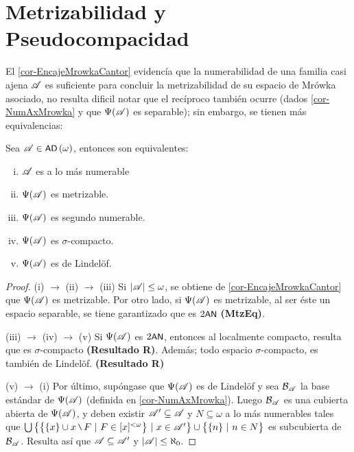 	\section{Metrizabilidad y Pseudocompacidad}

	El \autoref{cor-EncajeMrowkaCantor} evidencía que la numerabilidad de una familia casi ajena $\mathscr{A}$ es suficiente para concluir la metrizabilidad de su espacio de Mrówka asociado, no resulta dificil notar que el recíproco también ocurre (dados \ref{cor-NumAxMrowka} y que $\Psi(\mathscr{A})$ es separable); sin embargo, se tienen más equivalencias:
	
	\begin{proposicion}\label{prop-tra-numerable}
		Sea $\mathscr{A}\in \operatorname{\text{\textsf{\small AD}}}\,(\omega)$, entonces son equivalentes:
		\begin{enumerate}[i)]
			\item $\mathscr{A}$ es a lo más numerable
			\item $\Psi(\mathscr{A})$ es metrizable.
			\item $\Psi(\mathscr{A})$ es segundo numerable.
			\item $\Psi(\mathscr{A})$ es $\sigma$-compacto.
			\item $\Psi(\mathscr{A})$ es de Lindelöf.
		\end{enumerate}
	\end{proposicion}
	
	\begin{proof} 
		(i) $\rightarrow$ (ii) $\rightarrow$ (iii) Si $|\mathscr{A}| \leq \omega$, se obtiene de \ref{cor-EncajeMrowkaCantor} que $\Psi(\mathscr{A})$ es metrizable. Por otro lado, si $\Psi(\mathscr{A})$ es metrizable, al ser éste un espacio separable, se tiene garantizado que es $2\text{\textsf{\small AN}}$ \textbf{(MtzEq)}.
			
		(iii) $\rightarrow$ (iv) $\to$ (v) Si $\Psi(\mathscr{A})$ es $2\text{\textsf{\small AN}}$, entonces al localmente compacto, resulta que es $\sigma$-compacto \textbf{(Resultado R)}. Además; todo espacio $\sigma$-compacto, es también de Lindelöf. \textbf{(Resultado R)}
			
		(v) $\rightarrow$ (i) Por último, supóngase que $\Psi(\mathscr{A})$ es de Lindelöf y sea $\mathcal{B}_{\mathscr{A}}$ la base estándar de $\Psi(\mathscr{A})$ (definida en \ref{cor-NumAxMrowka}). Luego $\mathcal{B}_ {\mathscr{A}}$ es una cubierta abierta de $\Psi(\mathscr{A})$, y deben existir $\mathscr{A}' \subseteq \mathscr{A}$ y $N \subseteq \omega$ a lo más numerables tales que $\midcup \big\{ \big\{ \{x\} \cup x \setminus F \tq F \in [x]^{<\omega} \big\} \tq x \in \ms{A}' \big\} \cup \big\{ \{n\} \tq n \in N \big\}$ es subcubierta de $\mathcal{B}_ {\mathscr{A}}$. Resulta así que $\mathscr{A} \subseteq \mathscr{A}'$ y $|\mathscr{A}| \leq \aleph_0$.
	\end{proof}
	
